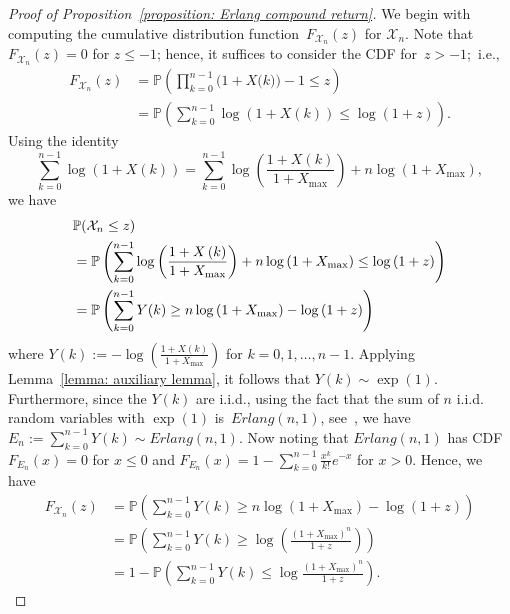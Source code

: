 \documentclass[letterpaper, 10 pt, journal, twoside]{IEEEtran}  %
\begin{document}
 \begin{proof}[Proof of Proposition~\ref{proposition: Erlang compound return}] We begin with computing the cumulative distribution function~$F_{\mathcal{X}_n}(z)$ for $\mathcal{X}_n$. Note that~$F_{\mathcal{X}_n}(z)= 0$ for $z \le -1$; hence, it suffices to consider the CDF for~$z > -1$;~i.e.,
\begin{align*}
	F_{\mathcal{X}_n}(z)
	&= \mathbb{P}\left( {\prod\limits_{k = 0}^{n - 1} {(1 + X(} k)) - 1 \le z} \right)
	\\
	&= \mathbb{P}\left( {\sum\limits_{k = 0}^{n - 1} {\log (1 + X(k))}  \le \log \left( {1 + z} \right)} \right).
\end{align*}
Using the identity 
{\small 
\[
\sum_{k = 0}^{n - 1} {\log (1 + X(k))}  = \sum_{k = 0}^{n - 1} {\log \left( {\frac{{1 + X( k )}}{1 + X_{\max }}} \right)}  + n\log \left( {1 + {X_{\max }}} \right),
\]
}we have
{\small \begin{align*}
 &\mathbb{P} ({\cal X}_n \le z) \\
	&= \mathbb{P} \left( {\sum_{k = 0}^{n - 1} {\log \left( {\frac{{1 + X\left( k \right)}}{{1+X_{\max} }}} \right)}  + n\log \left( {1+X_{\max} } \right) \le \log \left( {1 + z} \right)} \right)
	\\
	&  = \mathbb{P} \left( {\sum_{k = 0}^{n - 1} Y (k) \ge n\log \left( 1 + X_{\max} \right) - \log \left( {1 + z} \right)} \right)
\end{align*}
}where
$ Y(k) := - \log \left( \frac{1 + X( k )}{1+X_{\max}} \right)
$
for $k=0,1, \dots ,n-1$.
Applying Lemma~\ref{lemma: auxiliary lemma}, it follows that $Y(k)\sim \exp(1)$. Furthermore, since the $Y(k)$ are i.i.d., using the fact that the sum of $n$ i.i.d. random variables with $\exp(1)$ is~$Erlang(n,1)$, see~\cite{gubner2006probability}, we have
$
E_n := \sum_{k=0}^{n-1} Y(k) \sim Erlang(n,1).
$
Now noting that $Erlang(n,1)$ has CDF $F_{E_n}(x) =0$ for $x \le 0$ and
$
F_{E_n}(x)= 1 - \sum_{k=0}^{n-1} \frac{x^k}{k!}e^{-x}
$  
for $x>0$. Hence, we have
\begin{align*}
	F_{\mathcal{X}_n}(z)
	& = \mathbb{P}\left( { \sum_{k=0}^{n-1} Y(k)   \ge n\log \left( {1 + {X_{\max }}} \right) - \log \left( {1 + z} \right)} \right)
	\\
	& = \mathbb{P}\left( {\sum_{k=0}^{n-1} Y(k)  \ge \log \left( {\frac{{{ {\left( 1 + X_{\max } \right) }^n}}}{{1 + z}}} \right)} \right)
	\\ 
	&= 1 - \mathbb{P}\left( {\sum_{k=0}^{n-1} Y(k)   \le \log  {\frac{{{{\left( 1+X_{\max} \right)}^n}}}{{1 + z}}} } \right).
\end{align*}

\end{proof}
\end{document}
